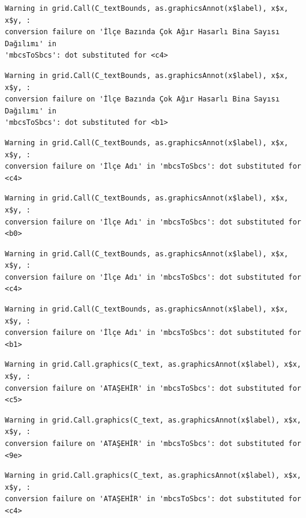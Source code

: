 \documentclass[
  11pt,
  a4paper,
  DIV=11,
  numbers=noendperiod]{scrartcl}
\begin{document}
\begin{verbatim}
Warning in grid.Call(C_textBounds, as.graphicsAnnot(x$label), x$x, x$y, :
conversion failure on 'İlçe Bazında Çok Ağır Hasarlı Bina Sayısı Dağılımı' in
'mbcsToSbcs': dot substituted for <c4>
\end{verbatim}

\begin{verbatim}
Warning in grid.Call(C_textBounds, as.graphicsAnnot(x$label), x$x, x$y, :
conversion failure on 'İlçe Bazında Çok Ağır Hasarlı Bina Sayısı Dağılımı' in
'mbcsToSbcs': dot substituted for <b1>
\end{verbatim}

\begin{verbatim}
Warning in grid.Call(C_textBounds, as.graphicsAnnot(x$label), x$x, x$y, :
conversion failure on 'İlçe Adı' in 'mbcsToSbcs': dot substituted for <c4>
\end{verbatim}

\begin{verbatim}
Warning in grid.Call(C_textBounds, as.graphicsAnnot(x$label), x$x, x$y, :
conversion failure on 'İlçe Adı' in 'mbcsToSbcs': dot substituted for <b0>
\end{verbatim}

\begin{verbatim}
Warning in grid.Call(C_textBounds, as.graphicsAnnot(x$label), x$x, x$y, :
conversion failure on 'İlçe Adı' in 'mbcsToSbcs': dot substituted for <c4>
\end{verbatim}

\begin{verbatim}
Warning in grid.Call(C_textBounds, as.graphicsAnnot(x$label), x$x, x$y, :
conversion failure on 'İlçe Adı' in 'mbcsToSbcs': dot substituted for <b1>
\end{verbatim}

\begin{verbatim}
Warning in grid.Call.graphics(C_text, as.graphicsAnnot(x$label), x$x, x$y, :
conversion failure on 'ATAŞEHİR' in 'mbcsToSbcs': dot substituted for <c5>
\end{verbatim}

\begin{verbatim}
Warning in grid.Call.graphics(C_text, as.graphicsAnnot(x$label), x$x, x$y, :
conversion failure on 'ATAŞEHİR' in 'mbcsToSbcs': dot substituted for <9e>
\end{verbatim}

\begin{verbatim}
Warning in grid.Call.graphics(C_text, as.graphicsAnnot(x$label), x$x, x$y, :
conversion failure on 'ATAŞEHİR' in 'mbcsToSbcs': dot substituted for <c4>
\end{verbatim}
\end{document}
